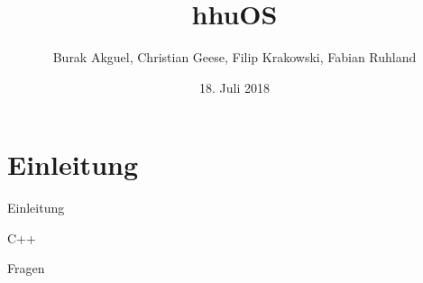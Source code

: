 \documentclass[german]{beamer}
\title{hhuOS}
\date{18. Juli 2018}
\author{Burak Akguel, Christian Geese, Filip Krakowski, Fabian Ruhland}
\institute{Institut für Informatik \\
	Heinrich-Heine-Universität Düsseldorf}
\begin{document}
	
	\maketitle
	
	\section{Einleitung}
	
	\begin{frame}{Einleitung}
	
		\begin{bpbox}{C++}
		\end{bpbox}
		
	\end{frame}

	\begin{frame}[standout]
			\Large Fragen
	\end{frame}
\end{document}
